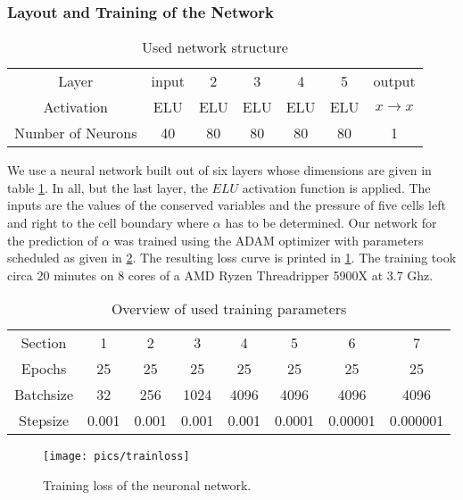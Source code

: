 	\subsubsection*{Layout and Training of the Network}
	\begin{table}
		\begin{tabular}{ccccccc}
			Layer 				& input & 2 	& 3 	& 4 	& 5 	& output\\
			Activation 			& ELU 	& ELU 	& ELU 	& ELU 	& ELU 	& $x \to x$\\
			Number of Neurons 	& 40 	& 80 	& 80 	& 80 	& 80 	& 1\\
		\end{tabular}
	\caption{Used network structure}
	\label{tab:net}
	\end{table}
	We use a neural  network built out of six layers whose dimensions are given in table \ref{tab:net}. In all, but the last layer, the $ELU$ activation function is applied. The inputs are  the values of the conserved variables and the pressure of five cells left and right to the cell boundary where $\alpha$ has to be determined.
	Our network for the prediction of $\alpha$ was trained using the ADAM optimizer \cite{kingma2017adam} with parameters scheduled as given in  \cref{tab:sched}.
		The resulting loss curve is printed in \cref{fig:loss}. The training took circa 20 minutes on 8 cores of a AMD Ryzen Threadripper 5900X at 3.7 Ghz. 
	\begin{table}
		\begin{center}
		\begin{tabular}{cc cc cc cc}
			Section 	& 1 	& 2 	& 3 	& 4 	& 5 	& 6		& 7 \\
			Epochs 		& 25 	& 25 	& 25 	& 25 	& 25 	& 25 	& 25\\
			Batchsize 	& 32 	& 256 	& 1024 	& 4096 	& 4096 	& 4096  & 4096\\
			Stepsize  	&0.001 	& 0.001 & 0.001	& 0.001	& 0.0001& 0.00001& 0.000001\\
		\end{tabular}
		\caption{Overview of used training parameters}
		\label{tab:sched}
		\end{center}
	\end{table}	
	\begin{figure}
	\begin{center}
	\texttt{[image: pics/trainloss]}
		\caption{Training loss of the neuronal network.}
		\label{fig:loss}
		\end{center}
		\end{figure}
